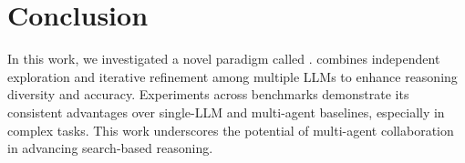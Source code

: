\section{Conclusion}
\label{sec:conclusion}
In this work, we investigated a novel paradigm called \mosa{}.
\mosa{} combines independent exploration and iterative refinement among multiple LLMs to enhance reasoning diversity and accuracy. 
Experiments across benchmarks demonstrate its consistent advantages over single-LLM and multi-agent baselines, especially in complex tasks. 
This work underscores the potential of multi-agent collaboration in advancing search-based reasoning.